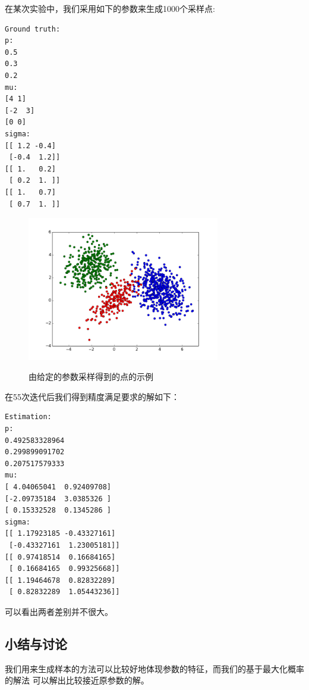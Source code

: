 \documentclass[10pt,a4paper]{article}
\theoremstyle{mythm}%
\numberwithin{equation}{section}
\begin{document}
\begin{CJK*}{UTF8}{wqyzh}
在某次实验中，我们采用如下的参数来生成1000个采样点:

\begin{verbatim}
Ground truth:
p:
0.5
0.3
0.2
mu:
[4 1]
[-2  3]
[0 0]
sigma:
[[ 1.2 -0.4]
 [-0.4  1.2]]
[[ 1.   0.2]
 [ 0.2  1. ]]
[[ 1.   0.7]
 [ 0.7  1. ]]
\end{verbatim}

\begin{figure}[h]
    \centering
    \def\_width{0.75\textwidth}
    \includegraphics[width=\_width]{figs/gauss-0.png}
    \caption{
        由给定的参数采样得到的点的示例
    }{}
    \label{fig:gauss}
\end{figure}

在55次迭代后我们得到精度满足要求的解如下：
\begin{verbatim}
Estimation:
p:
0.492583328964
0.299899091702
0.207517579333
mu:
[ 4.04065041  0.92409708]
[-2.09735184  3.0385326 ]
[ 0.15332528  0.1345286 ]
sigma:
[[ 1.17923185 -0.43327161]
 [-0.43327161  1.23005181]]
[[ 0.97418514  0.16684165]
 [ 0.16684165  0.99325668]]
[[ 1.19464678  0.82832289]
 [ 0.82832289  1.05443236]]
\end{verbatim}

可以看出两者差别并不很大。

\subsection{小结与讨论}

我们用来生成样本的方法可以比较好地体现参数的特征，而我们的基于最大化概率的解法
可以解出比较接近原参数的解。


\end{CJK*}
\end{document}
